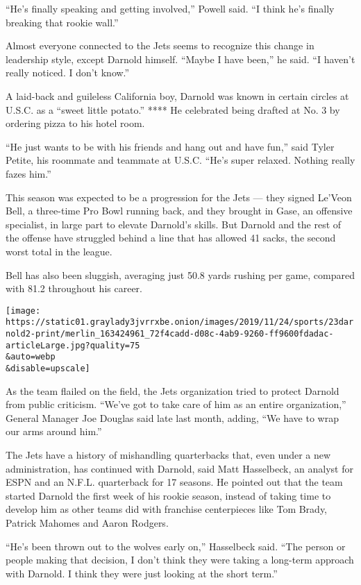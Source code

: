 ``He's finally speaking and getting involved,'' Powell said. ``I think
he's finally breaking that rookie wall.''

Almost everyone connected to the Jets seems to recognize this change in
leadership style, except Darnold himself. ``Maybe I have been,'' he
said. ``I haven't really noticed. I don't know.''

A laid-back and guileless California boy, Darnold was known in certain
circles at U.S.C. as a ``sweet little potato.'' **** He celebrated being
drafted at No. 3 by ordering pizza to his hotel room.

``He just wants to be with his friends and hang out and have fun,'' said
Tyler Petite, his roommate and teammate at U.S.C. ``He's super relaxed.
Nothing really fazes him.''

This season was expected to be a progression for the Jets --- they
signed Le'Veon Bell, a three-time Pro Bowl running back, and they
brought in Gase, an offensive specialist, in large part to elevate
Darnold's skills. But Darnold and the rest of the offense have struggled
behind a line that has allowed 41 sacks, the second worst total in the
league.

Bell has also been sluggish, averaging just 50.8 yards rushing per game,
compared with 81.2 throughout his career.

\texttt{[image: https://static01.graylady3jvrrxbe.onion/images/2019/11/24/sports/23darnold2-print/merlin\_163424961\_72f4cadd-d08c-4ab9-9260-ff9600fdadac-articleLarge.jpg?quality=75\\\&auto=webp\\\&disable=upscale]}

As the team flailed on the field, the Jets organization tried to protect
Darnold from public criticism. ``We've got to take care of him as an
entire organization,'' General Manager Joe Douglas said late last month,
adding, ``We have to wrap our arms around him.''

The Jets have a history of mishandling quarterbacks that, even under a
new administration, has continued with Darnold, said Matt Hasselbeck, an
analyst for ESPN and an N.F.L. quarterback for 17 seasons. He pointed
out that the team started Darnold the first week of his rookie season,
instead of taking time to develop him as other teams did with franchise
centerpieces like Tom Brady, Patrick Mahomes and Aaron Rodgers.

``He's been thrown out to the wolves early on,'' Hasselbeck said. ``The
person or people making that decision, I don't think they were taking a
long-term approach with Darnold. I think they were just looking at the
short term.''

